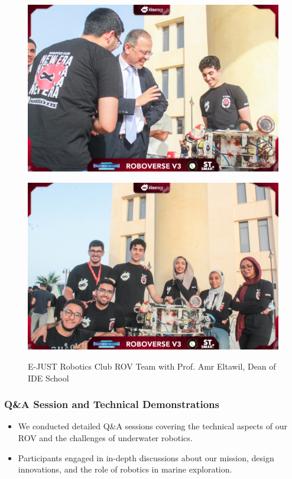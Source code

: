 \documentclass[11pt, twocolumn]{article}
\begin{document}
\begin{figure}[h]
    \centering
    \begin{minipage}{0.48\textwidth}
        \centering
        \includegraphics[width=\textwidth]{Images/ROV1.jpg}
        
        \label{fig:ROV1}
    \end{minipage}
    \hfill
    \begin{minipage}{0.48\textwidth}
        \centering
        \includegraphics[width=\textwidth]{Images/ROV2.jpg}
      
        \label{fig:ROV2}
    \end{minipage}
    \caption{E-JUST Robotics Club ROV Team with Prof. Amr Eltawil, Dean of IDE School}
    \label{fig:ROV}
\end{figure}

\subsubsection{Q\&A Session and Technical Demonstrations}
\begin{itemize}
    \item We conducted detailed Q\&A sessions covering the technical aspects of our ROV and the challenges of underwater robotics.
    \item Participants engaged in in-depth discussions about our mission, design innovations, and the role of robotics in marine exploration.
\end{itemize}
\end{document}
